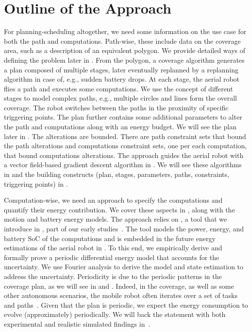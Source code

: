 \section{Outline of the Approach}
\label{sec:outline}

For planning-scheduling altogether, we need some information on the use case for both the path and computations. Path-wise, these include data on the coverage area, such as a description of an equivalent polygon. We provide detailed ways of defining the problem later in . From the polygon, a coverage algorithm generates a plan composed of multiple stages, later eventually replanned by a replanning algorithm in case of, e.g., sudden battery drops. At each stage, the aerial robot flies a path and executes some computations. We use the concept of different stages to model complex paths, e.g., multiple circles and lines form the overall coverage. The robot switches between the paths in the proximity of specific triggering points. The plan further contains some additional parameters to alter the path and computations along with an energy budget. We will see the plan later in . The alterations are bounded. There are path constraint sets that bound the path alterations and computations constraint sets, one per each computation, that bound computations alterations. The approach guides the aerial robot with a vector field-based gradient descent algorithm in . We will see these algorithms in  and the building constructs (plan, stages, parameters, paths, constraints, triggering points) in .

Computation-wise, we need an approach to specify the computations and quantify their energy contribution. We cover these aspects in , along with the motion and battery energy models. The approach relies on \powprof{}, a tool that we introduce in , part of our early studies~\citep{seewald2019component,seewald2019coarse}. The tool models the power, energy, and battery SoC of the computations and is embedded in the future energy estimations of the aerial robot in . To this end, we empirically derive and formally prove a periodic differential energy model that accounts for the uncertainty. We use Fourier analysis to derive the model and state estimation to address the uncertainty. Periodicity is due to the periodic patterns in the coverage plan, as we will see in  and . Indeed, in the coverage, as well as some other autonomous scenarios, the mobile robot often iterates over a set of tasks and paths~\citep{seewald2020mechanical,seewald202Xenergy}. Given that the plan is periodic, we expect the energy consumption to evolve (approximately) periodically. We will back the statement with both experimental and realistic simulated findings in~.

